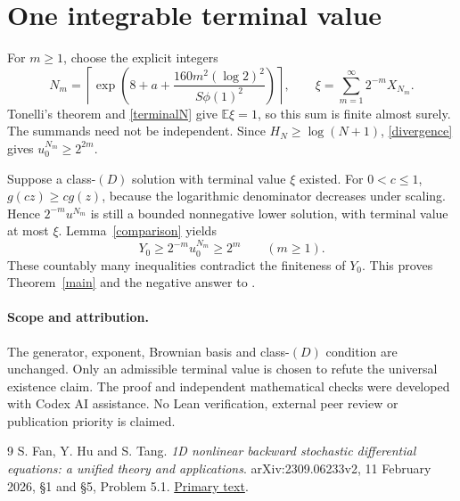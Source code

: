 \documentclass[11pt]{article}
\newcommand{\E}{\mathbb E}
\begin{document}
\section*{One integrable terminal value}
For $m\geq1$, choose the explicit integers
\[
 N_m=\left\lceil\exp\left(8+a+
        \frac{160m^2(\log2)^2}{S\phi(1)^2}\right)\right\rceil,
 \qquad
 \xi=\sum_{m=1}^{\infty}2^{-m}X_{N_m}.
\]
Tonelli's theorem and \eqref{terminalN} give $\E\xi=1$, so this sum
is finite almost surely. The summands need not be independent.
Since $H_N\geq\log(N+1)$, \eqref{divergence} gives
$u^{N_m}_0\geq2^{2m}$.

Suppose a class-$(D)$ solution with terminal value $\xi$ existed.
For $0<c\leq1$, $g(cz)\geq c g(z)$, because the logarithmic denominator
decreases under scaling. Hence $2^{-m}u^{N_m}$ is still a bounded
nonnegative lower solution, with terminal value at most $\xi$.
Lemma~\ref{comparison} yields
\[
 Y_0\geq2^{-m}u^{N_m}_0\geq2^m\qquad(m\geq1).
\]
These countably many inequalities contradict the finiteness of $Y_0$.
This proves Theorem~\ref{main} and the negative answer to
\cite[Problem 5.1, equation (5.1)]{FHT}.

\paragraph{Scope and attribution.}
The generator, exponent, Brownian basis and class-$(D)$ condition are
unchanged. Only an admissible terminal value is chosen to refute the
universal existence claim. The proof and independent mathematical checks
were developed with Codex AI assistance. No Lean verification, external
peer review or publication priority is claimed.

\begin{thebibliography}{9}
S. Fan, Y. Hu and S. Tang.
\emph{1D nonlinear backward stochastic differential equations:
a unified theory and applications}.
arXiv:2309.06233v2, 11 February 2026, \S1 and \S5, Problem 5.1.
\href{https://arxiv.org/html/2309.06233v2#S5}{Primary text}.
\end{thebibliography}
\end{document}
